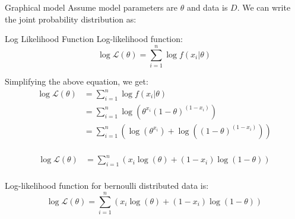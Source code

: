 \documentclass[handout]{beamer}
\begin{document}
    \begin{frame}{Graphical model}
        Assume model parameters are $\theta$ and data is $D  $. We can write the joint probability distribution as:

        
    \end{frame}
    
    \begin{frame}{Log Likelihood Function}
        Log-likelihood function:
        \begin{equation}
            \log \mathcal{L}(\theta) = \sum_{i=1}^n \log f(x_i|\theta)
        \end{equation}
    
        Simplifying the above equation, we get:
        \begin{align*}
            \log \mathcal{L}(\theta) &= \sum_{i=1}^n \log f(x_i|\theta) \\
            &= \sum_{i=1}^n \log \left (\theta^{x_{i}}(1-\theta)^{(1-x_{i})} \right) \\
            &= \sum_{i=1}^n \left( \log \left( \theta^{x_{i}} \right) + \log \left( (1-\theta)^{(1-x_{i})}  \right) \right) \\
            \end{align*}
    \end{frame}
    \begin{frame}
       
        \begin{align*}
            \log \mathcal{L}(\theta) &= \sum_{i=1}^n \left (x_{i}\log \left( \theta \right) + (1-x_{i})\log \left(1-\theta \right) \right)\\
            \end{align*}
            \begin{tcolorbox}[colback=metropolisblue!5,colframe=metropolisblue,title=Log Likelihood Function for Bernoulli Distribution]
                Log-likelihood function for bernoulli distributed data is:
                \[
                    \log \mathcal{L}(\theta) = \sum_{i=1}^n  (x_{i}\log(\theta) + (1-x_{i})\log(1-\theta))
                    \]
            \end{tcolorbox}
    \end{frame}
    
\end{document}

